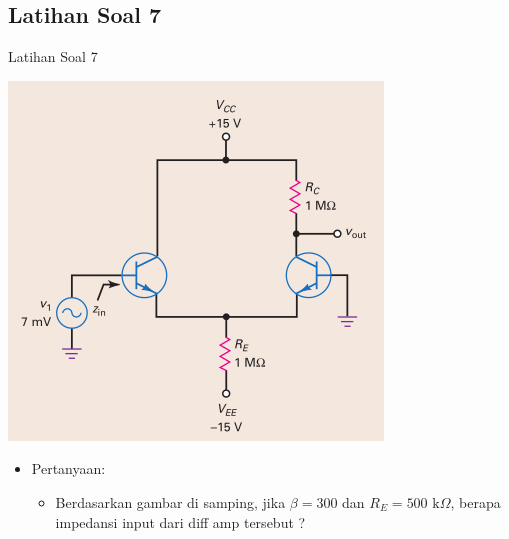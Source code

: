 \documentclass[aspectratio=169]{beamer}
\begin{document}
\subsection{Latihan Soal 7}
\begin{frame}{Latihan Soal 7}
	\begin{multicols}{2}
		\begin{center}
			\includegraphics[height=0.7\textheight]{gambar/01.contoh_soal_07}
		\end{center}
		\columnbreak
		\begin{itemize}
			\item Pertanyaan:
			\begin{itemize}
				\item Berdasarkan gambar di samping, jika $ \beta = 300 $ dan $ R_E = 500 \text{ k}\Omega $, berapa impedansi input dari diff amp tersebut ?
			\end{itemize}
		\end{itemize}
	\end{multicols}
\end{frame}
\end{document}
